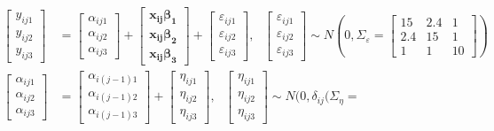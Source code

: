 \documentclass[
]{article}
\begin{document}
\begin{equation*}
\begin{aligned}
\begin{bmatrix}
y_{ij1}\\
y_{ij2}\\
y_{ij3}
\end{bmatrix}
&= \begin{bmatrix}
\alpha_{ij1}\\
\alpha_{ij2}\\
\alpha_{ij3}
\end{bmatrix}
+ 
\begin{bmatrix}
\boldsymbol{x_{ij}\beta_1}\\
\boldsymbol{x_{ij}\beta_2}\\
\boldsymbol{x_{ij}\beta_3} 
\end{bmatrix} +
\begin{bmatrix}
\varepsilon_{ij1}\\
\varepsilon_{ij2}\\
\varepsilon_{ij3}
\end{bmatrix}, \ \ \ 
\begin{bmatrix}
\varepsilon_{ij1}\\
\varepsilon_{ij2}\\
\varepsilon_{ij3}
\end{bmatrix} 
\sim N(0, \Sigma_\varepsilon = 
\begin{bmatrix}
15 & 2.4 & 1\\
2.4 & 15 & 1\\
1 & 1 & 10
\end{bmatrix}
)\\
\begin{bmatrix}
\alpha_{ij1}\\
\alpha_{ij2}\\
\alpha_{ij3}
\end{bmatrix} & = 
\begin{bmatrix}
\alpha_{i(j-1)1}\\
\alpha_{i(j-1)2}\\
\alpha_{i(j-1)3}
\end{bmatrix} +
\begin{bmatrix}
\eta_{ij1}\\
\eta_{ij2}\\
\eta_{ij3}
\end{bmatrix}, \ \ \
\begin{bmatrix}
\eta_{ij1}\\
\eta_{ij2}\\
\eta_{ij3}
\end{bmatrix} \sim N(0, \delta_{ij} (\Sigma_\eta =

\end{aligned}
\end{equation*}
\end{document}
